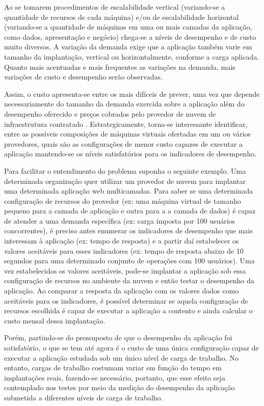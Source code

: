 Ao se tomarem procedimentos de escalabilidade vertical (variando-se a quantidade 
de recursos de cada máquina) e/ou de escalabilidade horizontal (variando-se a 
quantidade de máquinas em uma ou mais camadas da aplicação, como dados, apresentação 
e negócio) chega-se a níveis de desempenho e de custo muito diversos. A variação 
da demanda exige que a aplicação também varie em tamanho da implantação, vertical 
ou horizontalmente, conforme a carga aplicada. Quanto mais acentuadas e mais 
frequentes as variações na demanda, mais variações de custo e desempenho serão 
observadas.

Assim, o custo apresenta-se entre os mais difíceis de prever, uma vez que depende 
necessariamente do tamanho da demanda exercida sobre a aplicação além do desempenho 
oferecido e preços cobrados pelo provedor de nuvem de infraestrutura contratado 
\cite{cunha2012ambiente}. Estrategicamente, torna-se interessante identificar, 
entre as possíveis composições de máquinas virtuais ofertadas em um ou vários 
provedores, quais são as configurações de menor custo capazes de executar a 
aplicação mantendo-se os níveis satisfatórios para os indicadores de desempenho.

Para facilitar o entendimento do problema suponha o seguinte exemplo. Uma
determinada organização quer utilizar um provedor de nuvem para implantar uma
determinada aplicação web multicamadas. Para saber se uma determinada 
configuração de recursos do provedor (ex: uma máquina virtual de tamanho
pequeno para a camada de aplicação e outra para a a camada de dados) é capaz de
atender a uma demanda específica (ex: carga imposta por 100 usuários
concorrentes), é preciso antes enumerar os indicadores de desempenho que mais
interessam à aplicação (ex: tempo de resposta) e a partir daí estabelecer os
valores aceitáveis para esses indicadores (ex: tempo de resposta abaixo de 10
segundos para uma determinado conjunto de operações com 100 usuários).
Uma vez estabelecidos os valores aceitáveis, pode-se implantar a aplicação 
sob essa configuração de recursos no ambiente da nuvem e então testar o
desempenho da aplicação. Ao comparar a resposta da aplicação com os valores
dados como aceitáveis para os indicadores, é possível determinar se aquela 
configuração de recursos escolhida é capaz de executar a aplicação a contento e 
ainda calcular o custo mensal dessa implantação.

Porém, partindo-se do pressuposto de que o desempenho da aplicação foi satisfatório, 
o que se tem até agora é o custo de uma única configuração capaz de executar a 
aplicação estudada sob um único nível de carga de trabalho. No entanto, cargas de 
trabalho costumam variar em função do tempo em implantações reais, fazendo-se 
necessário, portanto, que esse efeito seja contemplado nos testes por meio da 
medição do desempenho da aplicação submetida a diferentes níveis de carga de 
trabalho.

